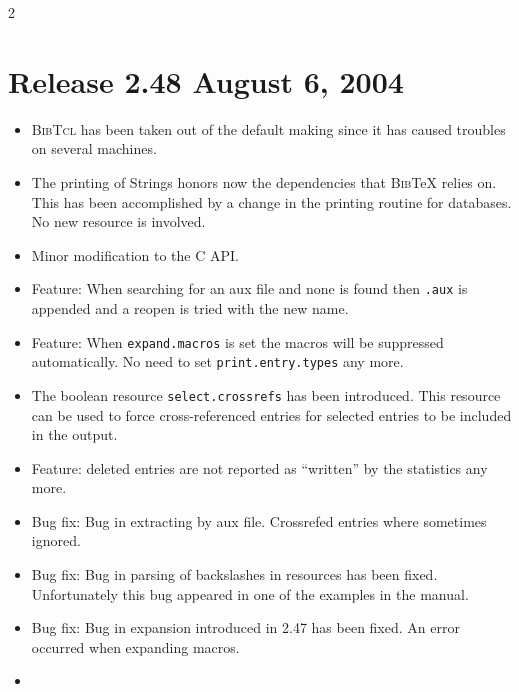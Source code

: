 \documentclass[11pt,a4paper]{scrartcl}
\newcommand\rsc[1]{\texttt{#1}}
\newcommand\BibTcl{\textsc{BibTcl}}
\newcommand\BibTeX{\textsc{Bib}\TeX}
\newenvironment{Releases}{\begin{multicols}2\RaggedRight}{\end{multicols}}
\newenvironment{Release}[2]{%
  \def\tmp{#2}%
  \section*{Release #1 \ifx\tmp\empty\else{\normalsize[#2]}\fi}
  \begin{itemize}
}{\end{itemize}}
\newenvironment{Fix}[1]{\item }{}
\newenvironment{New}[1]{\item }{}
\newenvironment{Update}[1]{\item }{}
\begin{document}
\begin{Releases}
\begin{Release}{2.48}{August 6, 2004}
   \begin{Update}{gene}
     \BibTcl{} has been taken out of the default making since it has
     caused troubles on several machines.
   \end{Update}
   \begin{Update}{gene}
     The printing of Strings honors now the dependencies that
     \BibTeX{} relies on. This has been accomplished by a change in
     the printing routine for databases. No new resource is involved.
   \end{Update}
   \begin{Update}{gene}
     Minor modification to the C API.
   \end{Update}
  \begin{New}{gene}
    Feature: When searching for an aux file and none is found then
    \texttt{.aux} is appended and a reopen is tried with the new name.
  \end{New}
  \begin{Update}{gene}
    Feature: When \rsc{expand.macros} is set the macros will be
    suppressed automatically. No need to set \rsc{print.entry.types}
    any more.
  \end{Update}
  \begin{New}{gene}
    The boolean resource \rsc{select.crossrefs} has been introduced.
    This resource can be used to force cross-referenced entries for
    selected entries to be included in the output.
  \end{New}
  \begin{Update}{gene}
    Feature: deleted entries are not reported as "`written"' by the
    statistics any more.
  \end{Update}
  \begin{Fix}{gene}
    Bug fix: Bug in extracting by aux file. Crossrefed entries where
    sometimes ignored.
  \end{Fix}
  \begin{Fix}{gene}
    Bug fix: Bug in parsing of backslashes in resources has been fixed.
    Unfortunately this bug appeared in one of the examples in the
    manual.
  \end{Fix}
  \begin{Fix}{gene}
    Bug fix: Bug in expansion introduced in 2.47 has been fixed. An
    error occurred when expanding macros.
  \end{Fix}
  \begin{New}{gene}

\end{New}
\end{Release}
\end{Releases}
\end{document}
